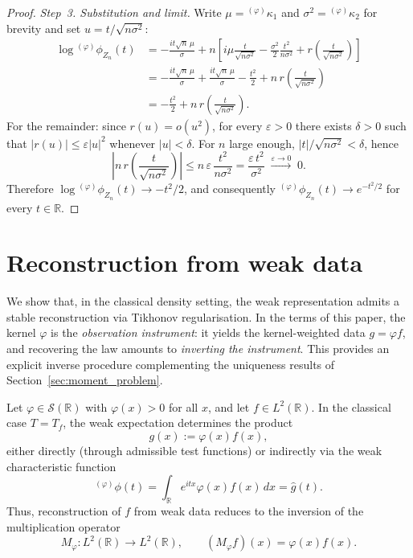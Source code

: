 \documentclass[12pt]{article}
\theoremstyle{definition}
\newcommand{\R}{\mathbb{R}}
\begin{document}
\begin{proof}
\emph{Step~3.  Substitution and limit.}
Write $\mu={}^{(\varphi)}\kappa_1$ and $\sigma^2={}^{(\varphi)}\kappa_2$
for brevity and set $u=t/\sqrt{n\sigma^2}$:
\begin{align*}
\log{}^{(\varphi)}\phi_{Z_n}(t)
&= -\frac{it\sqrt{n}\,\mu}{\sigma}
+ n\!\left[
i\mu\frac{t}{\sqrt{n\sigma^2}}
-\frac{\sigma^2}{2}\frac{t^2}{n\sigma^2}
+ r\!\left(\frac{t}{\sqrt{n\sigma^2}}\right)
\right] \\
&= -\frac{it\sqrt{n}\,\mu}{\sigma}
+ \frac{it\sqrt{n}\,\mu}{\sigma}
- \frac{t^2}{2}
+ n\,r\!\left(\frac{t}{\sqrt{n\sigma^2}}\right) \\
&= -\frac{t^2}{2}
+ n\,r\!\left(\frac{t}{\sqrt{n\sigma^2}}\right).
\end{align*}
For the remainder: since $r(u)=o(u^2)$, for every $\varepsilon>0$
there exists $\delta>0$ such that $|r(u)|\le\varepsilon|u|^2$
whenever $|u|<\delta$.  For $n$ large enough,
$|t|/\sqrt{n\sigma^2}<\delta$, hence
\[
\left|n\,r\!\left(\frac{t}{\sqrt{n\sigma^2}}\right)\right|
\le n\,\varepsilon\,\frac{t^2}{n\sigma^2}
= \frac{\varepsilon\,t^2}{\sigma^2}
\;\xrightarrow{\varepsilon\to 0}\; 0.
\]
Therefore $\log{}^{(\varphi)}\phi_{Z_n}(t)\to -t^2/2$, and consequently
${}^{(\varphi)}\phi_{Z_n}(t)\to e^{-t^2/2}$ for every $t\in\R$.
\end{proof}

\section{Reconstruction from weak data}
\label{app:reconstruction}

\medskip
\noindent
We show that, in the classical density setting, the weak
representation admits a stable reconstruction via Tikhonov
regularisation. In the terms of this paper, the kernel $\varphi$ is the
\emph{observation instrument}: it yields the kernel-weighted data
$g=\varphi f$, and recovering the law amounts to \emph{inverting the
instrument}. This provides an explicit inverse procedure complementing
the uniqueness results of Section~\ref{sec:moment_problem}.

\medskip

Let $\varphi\in\mathcal{S}(\R)$ with $\varphi(x)>0$ for all $x$, and let
$f\in L^2(\R)$. In the classical case $T=T_f$, the weak expectation
determines the product
\[
g(x) := \varphi(x) f(x),
\]
either directly (through admissible test functions) or indirectly via the
weak characteristic function
\[
{}^{(\varphi)}\phi(t)
=
\int_{\R} e^{itx}\varphi(x)f(x)\,dx
=
\widehat{g}(t).
\]
Thus, reconstruction of $f$ from weak data reduces to the inversion of the
multiplication operator
\[
M_\varphi : L^2(\R) \to L^2(\R),
\qquad
(M_\varphi f)(x) = \varphi(x) f(x).
\]
\end{document}
